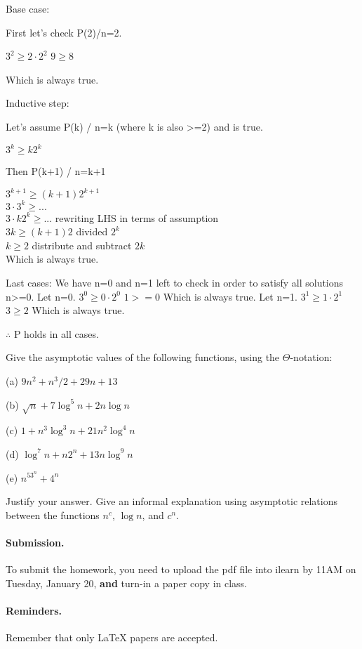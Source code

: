 \documentclass{article}
\begin{document}
\begin{flushleft}
Base case:

First let's check P(2)/n=2.

$3^2 \ge 2\cdot2^2$
$9 \ge 8$

Which is always true.

\vskip 0.1in
Inductive step:

Let's assume P(k) / n=k (where k is also >=2) and is true.

$3^k \ge k2^k$

Then P(k+1) / n=k+1

$3^{k+1} \ge (k+1)2^{k+1}$ \\
$3\cdot3^k \ge ...$  \\
$3\cdot k 2^k \ge ...$ rewriting LHS in terms of assumption \\
$3k \ge (k+1)2$ divided $2^k$ \\
$k \ge 2$ distribute and subtract $2k$ \\
Which is always true.

\vskip 0.1in
Last cases:
We have n=0 and n=1 left to check in order to satisfy all solutions n>=0.
Let n=0.
$3^0 \ge 0\cdot2^0$
$1 >= 0$
Which is always true.
Let n=1.
$3^1 \ge 1\cdot2^1$
$3 \ge 2$
Which is always true.

\vskip 0.1in
$\therefore$ P holds in all cases.

\end{flushleft}




\begin{problem}
Give the asymptotic values of the
following functions, using the $\Theta$-notation:
%
\begin{description}
%
\item{(a)} $9n^2 + n^3/2 + 29n + 13$
\item{(b)} $\sqrt{n}+ 7\log^5 n + 2n\log n$
\item{(c)} $1+ n^3\log^3n + 21 n^2\log^4n$
\item{(d)} $\log^7n + n 2^n + 13n\log^9n$
\item{(e)} $n^53^n+4^n$
%
\end{description}
%
Justify your answer.
Give an informal explanation using asymptotic
relations between the functions $n^c$, $\log n$, and $c^n$.
\end{problem}



\vskip 0.1in
\paragraph{Submission.}
To submit the homework, you need to upload the pdf file into ilearn by 11AM on Tuesday, January 20,
\textbf{and} turn-in a paper copy in class.

\paragraph{Reminders.}
Remember that only {\LaTeX} papers are accepted. 
\end{document}
